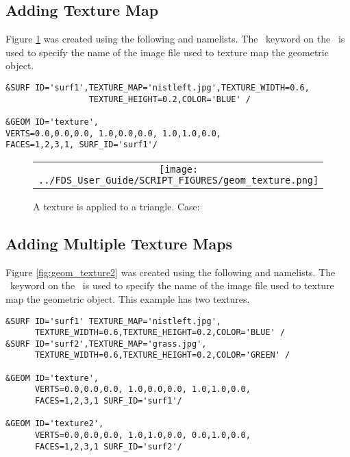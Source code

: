 \documentclass[11pt]{book}
\begin{document}
\FloatBarrier

\subsection{Adding Texture Map}

Figure \ref{fig:geom_texture} was created using the following  and  namelists.
The \ keyword on the \ is used to specify the name of the image
file used to texture map the geometric object.
\begin{lstlisting}
&SURF ID='surf1',TEXTURE_MAP='nistleft.jpg',TEXTURE_WIDTH=0.6,
                 TEXTURE_HEIGHT=0.2,COLOR='BLUE' /

&GEOM ID='texture',
VERTS=0.0,0.0,0.0, 1.0,0.0,0.0, 1.0,1.0,0.0,
FACES=1,2,3,1, SURF_ID='surf1'/
\end{lstlisting}

\begin{figure}[!ht]
\begin{center}
\begin{tabular}{c}
 \texttt{[image: ../FDS\_User\_Guide/SCRIPT\_FIGURES/geom\_texture.png]}
  \end{tabular}
\end{center}
 \caption[Applying a texture map to a  surface]{A texture is applied to a triangle. Case: }
\label{fig:geom_texture}
\end{figure}

\FloatBarrier

\subsection{Adding Multiple Texture Maps}

Figure \ref{fig:geom_texture2} was created using the following  and  namelists. The \ keyword on the \ is used to specify the name of the image file used to texture map the geometric object. This example has two textures.
\begin{lstlisting}
&SURF ID='surf1' TEXTURE_MAP='nistleft.jpg',
      TEXTURE_WIDTH=0.6,TEXTURE_HEIGHT=0.2,COLOR='BLUE' /
&SURF ID='surf2',TEXTURE_MAP='grass.jpg',
      TEXTURE_WIDTH=0.6,TEXTURE_HEIGHT=0.2,COLOR='GREEN' /

&GEOM ID='texture',
      VERTS=0.0,0.0,0.0, 1.0,0.0,0.0, 1.0,1.0,0.0,
      FACES=1,2,3,1 SURF_ID='surf1'/

&GEOM ID='texture2',
      VERTS=0.0,0.0,0.0, 1.0,1.0,0.0, 0.0,1.0,0.0,
      FACES=1,2,3,1 SURF_ID='surf2'/
\end{lstlisting}
\end{document}
